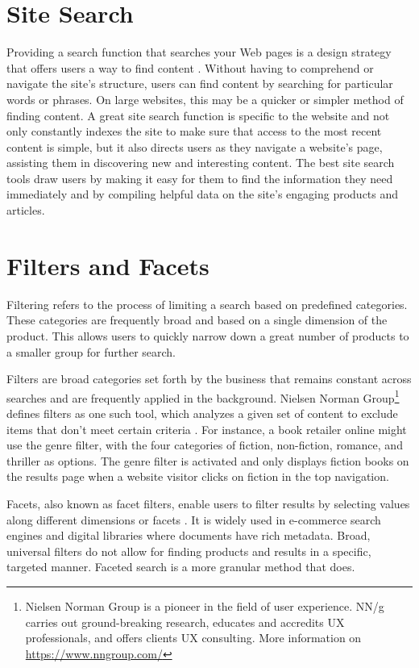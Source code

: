 \section{Site Search}
Providing a search function that searches your Web pages is a design strategy that offers users a way to find content \autocite{w3c2016search}. Without having to comprehend or navigate the site's structure, users can find content by searching for particular words or phrases. On large websites, this may be a quicker or simpler method of finding content. A great site search function is specific to the website and not only constantly indexes the site to make sure that access to the most recent content is simple, but it also directs users as they navigate a website's page, assisting them in discovering new and interesting content. The best site search tools draw users by making it easy for them to find the information they need immediately and by compiling helpful data on the site's engaging products and articles.


\section{Filters and Facets}
\label{filters_and_facets}
Filtering refers to the process of limiting a search based on predefined categories. These categories are frequently broad and based on a single dimension of the product. This allows users to quickly narrow down a great number of products to a smaller group for further search.

Filters are broad categories set forth by the business that remains constant across searches and are frequently applied in the background. Nielsen Norman Group\footnote{Nielsen Norman Group is a pioneer in the field of user experience. NN/g carries out ground-breaking research, educates and accredits UX professionals, and offers clients UX consulting. More information on \url{https://www.nngroup.com/}} defines filters as one such tool, which analyzes a given set of content to exclude items that don't meet certain criteria \autocite{whitenton2014filters}. For instance, a book retailer online might use the genre filter, with the four categories of fiction, non-fiction, romance, and thriller as options. The genre filter is activated and only displays fiction books on the results page when a website visitor clicks on fiction in the top navigation.

Facets, also known as facet filters, enable users to filter results by selecting values along different dimensions or facets \autocite{qu2021study}. It is widely used in e-commerce search engines and digital libraries where documents have rich metadata. Broad, universal filters do not allow for finding products and results in a specific, targeted manner. Faceted search is a more granular method that does.

